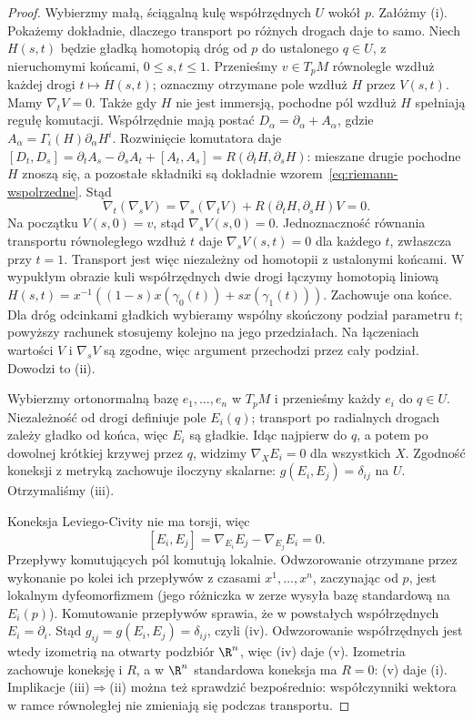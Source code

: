 \begin{proof}
Wybierzmy małą, ściągalną kulę współrzędnych $U$
wokół $p$. Załóżmy (i). Pokażemy dokładnie,
dlaczego transport po różnych drogach daje to samo.
Niech $H(s,t)$ będzie gładką homotopią dróg
od $p$ do ustalonego $q\in U$, z nieruchomymi
końcami, $0\leq s,t\leq1$. Przenieśmy
$v\in T_pM$ równolegle wzdłuż każdej drogi
$t\mapsto H(s,t)$; oznaczmy otrzymane pole
wzdłuż $H$ przez $V(s,t)$. Mamy $\nabla_tV=0$.
Także gdy $H$ nie jest immersją, pochodne pól wzdłuż
$H$ spełniają regułę komutacji. Współrzędnie mają
postać $D_\alpha=\partial_\alpha+A_\alpha$, gdzie
$A_\alpha=\Gamma_i(H)\partial_\alpha H^i$.
Rozwinięcie komutatora daje
$[D_t,D_s]=\partial_tA_s-\partial_sA_t+[A_t,A_s]
=R(\partial_tH,\partial_sH)$: mieszane drugie pochodne
$H$ znoszą się, a pozostałe składniki są dokładnie
wzorem~\eqref{eq:riemann-wspolrzedne}. Stąd
\[
 \nabla_t(\nabla_sV)
 =\nabla_s(\nabla_tV)+R(\partial_tH,\partial_sH)V=0.
\]
Na początku $V(s,0)=v$, stąd $\nabla_sV(s,0)=0$.
Jednoznaczność równania transportu równoległego
wzdłuż $t$ daje $\nabla_sV(s,t)=0$ dla każdego
$t$, zwłaszcza przy $t=1$. Transport jest więc
niezależny od homotopii z ustalonymi końcami.
W wypukłym obrazie kuli współrzędnych dwie drogi
łączymy homotopią liniową
$H(s,t)=x^{-1}((1-s)x(\gamma_0(t))+s x(\gamma_1(t)))$.
Zachowuje ona końce. Dla dróg odcinkami gładkich
wybieramy wspólny skończony podział parametru $t$;
powyższy rachunek stosujemy kolejno na jego przedziałach.
Na łączeniach wartości $V$ i $\nabla_sV$ są zgodne,
więc argument przechodzi przez cały podział. Dowodzi to (ii).

Wybierzmy ortonormalną bazę $e_1,\ldots,e_n$ w $T_pM$
i przenieśmy każdy $e_i$ do $q\in U$. Niezależność
od drogi definiuje pole $E_i(q)$; transport po
radialnych drogach zależy gładko od końca,
więc $E_i$ są gładkie. Idąc najpierw do $q$,
a potem po dowolnej krótkiej krzywej przez $q$,
widzimy $\nabla_XE_i=0$ dla wszystkich $X$.
Zgodność koneksji z metryką zachowuje iloczyny
skalarne: $g(E_i,E_j)=\delta_{ij}$ na $U$.
Otrzymaliśmy (iii).

Koneksja Leviego-Civity nie ma torsji, więc
\[
 [E_i,E_j]=\nabla_{E_i}E_j-\nabla_{E_j}E_i=0.
\]
Przepływy komutujących pól komutują lokalnie.
Odwzorowanie otrzymane przez wykonanie po kolei
ich przepływów z czasami $x^1,\ldots,x^n$,
zaczynając od $p$, jest lokalnym dyfeomorfizmem
(jego różniczka w zerze wysyła bazę standardową
na $E_i(p)$). Komutowanie przepływów sprawia,
że w powstałych współrzędnych $E_i=\partial_i$.
Stąd $g_{ij}=g(E_i,E_j)=\delta_{ij}$, czyli (iv).
Odwzorowanie współrzędnych jest wtedy izometrią
na otwarty podzbiór $\R^n$, więc (iv) daje (v).
Izometria zachowuje koneksję i $R$, a w $\R^n$
standardowa koneksja ma $R=0$: (v) daje (i).
Implikacje (iii)$\Rightarrow$(ii) można też
sprawdzić bezpośrednio: współczynniki wektora
w ramce równoległej nie zmieniają się podczas
transportu.


\end{proof}

